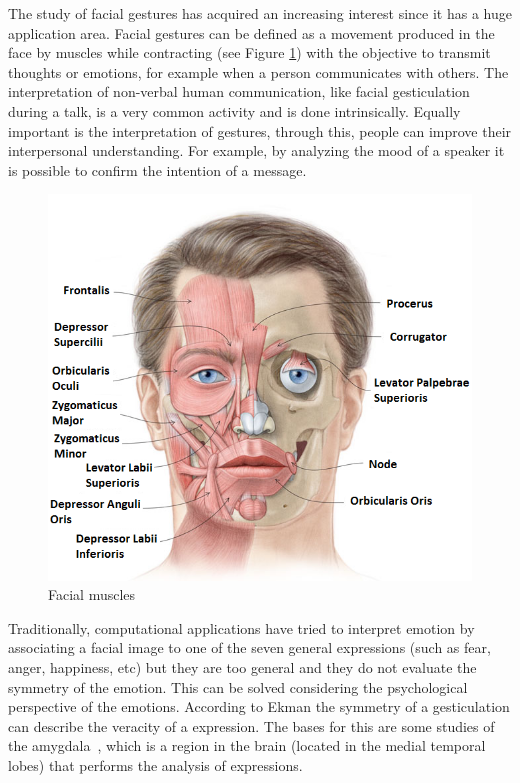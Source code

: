 The study of facial gestures has acquired an increasing interest since it has a huge application area. Facial gestures can be defined as a movement produced in the face by muscles while contracting (see Figure \ref{fig:Facial muscles}) with the objective to transmit thoughts or emotions, for example when a person communicates with others. The interpretation of non-verbal human communication, like facial gesticulation during a talk, is a very common activity and is done intrinsically. Equally important is the interpretation of gestures, through this, people can improve their interpersonal understanding. For example, by analyzing the mood of a speaker it is possible to confirm the intention of a message.

\begin{figure}[ht]
\centering
\includegraphics[scale=0.5]{images/Figure11FacialMuscles_name_2.png}
\caption{Facial muscles}
\label{fig:Facial muscles}
\end{figure}

Traditionally, computational applications have tried to interpret emotion by associating a facial image to one of the seven general expressions (such as fear, anger, happiness, etc) but they are too general and they do not evaluate the symmetry of the emotion. This can be solved considering the psychological perspective of the emotions. According to Ekman \cite{Hager1979} the symmetry of a gesticulation can describe the veracity of a expression. The bases for this are some studies of the amygdala~\cite{Sergerie2008}, which is a region in the brain (located in the medial temporal lobes) that performs the analysis of expressions.

